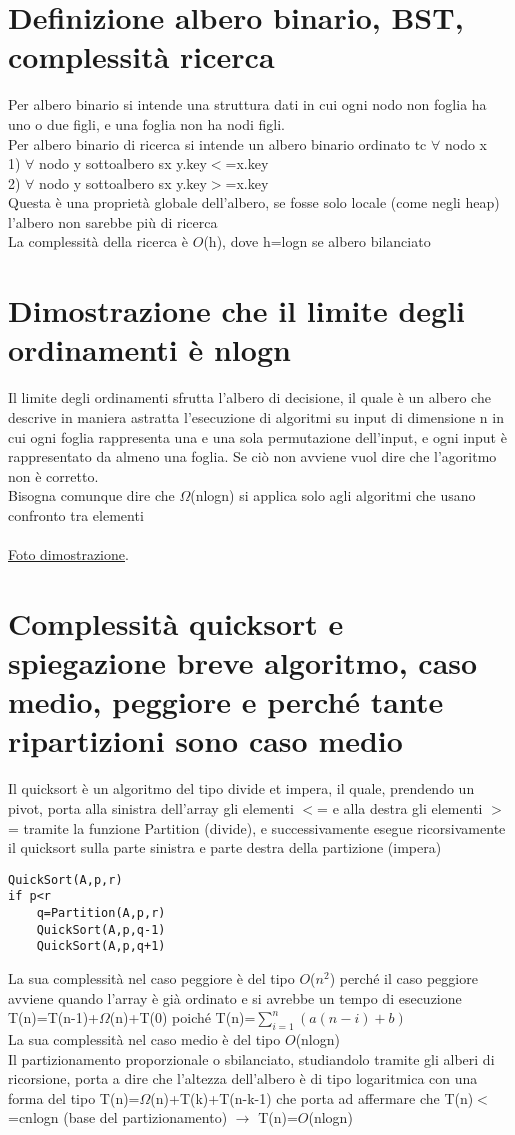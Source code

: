 \documentclass[12pt,oneside,a4paper]{article}
\newcommand\Omicron{O}
\begin{document}
\section{Definizione albero binario, BST, complessità ricerca}
Per albero binario si intende una struttura dati in cui ogni nodo non foglia ha uno o due figli, e una foglia non ha nodi figli.\\
Per albero binario di ricerca si intende un albero binario ordinato tc $\forall$ nodo x\\
1) $\forall$ nodo y sottoalbero sx y.key$<$=x.key \\
2) $\forall$ nodo y sottoalbero sx y.key$>$=x.key \\
Questa è una proprietà globale dell'albero, se fosse solo locale (come negli heap) l'albero non sarebbe più di ricerca\\
La complessità della ricerca è $\Omicron$(h), dove h=logn se albero bilanciato
\section{Dimostrazione che il limite degli ordinamenti è nlogn}
Il limite degli ordinamenti sfrutta l'albero di decisione, il quale è un albero che descrive in maniera astratta l'esecuzione di algoritmi su input di dimensione n in cui ogni foglia rappresenta una e una sola permutazione dell'input, e ogni input è rappresentato da almeno una foglia. Se ciò non avviene vuol dire che l'agoritmo non è corretto.\\
Bisogna comunque dire che $\Omega$(nlogn) si applica solo agli algoritmi che usano confronto tra elementi\\\\
\href{alberodecisione.pdf}{Foto dimostrazione}.
\section{Complessità quicksort e spiegazione breve algoritmo, caso medio, peggiore e perché tante ripartizioni sono caso medio}
Il quicksort è un algoritmo del tipo divide et impera, il quale, prendendo un pivot, porta alla sinistra dell'array gli elementi $<$= e alla destra gli elementi $>$= tramite la funzione Partition (divide), e successivamente esegue ricorsivamente il quicksort sulla parte sinistra e parte destra della partizione (impera)\\
\begin{lstlisting}[style=pseudocodice]
QuickSort(A,p,r)
if p<r
	q=Partition(A,p,r)
	QuickSort(A,p,q-1)
	QuickSort(A,p,q+1)
\end{lstlisting}
La sua complessità nel caso peggiore è del tipo $\Omicron$($n^2$) perché il caso peggiore avviene quando l'array è già ordinato e si avrebbe un tempo di esecuzione T(n)=T(n-1)+$\Omega$(n)+T(0) poiché T(n)=$\sum_{i=1}^n (a(n-i)+b)$ \\
La sua complessità nel caso medio è del tipo $\Omicron$(nlogn)\\
Il partizionamento proporzionale o sbilanciato, studiandolo tramite gli alberi di ricorsione, porta a dire che l'altezza dell'albero è di tipo logaritmica con una forma del tipo T(n)=$\Omega$(n)+T(k)+T(n-k-1) che porta ad affermare che T(n)$<$=cnlogn (base del partizionamento) $\to$ T(n)=$\Omicron$(nlogn)
\end{document}
